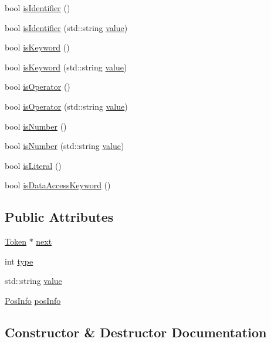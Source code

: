 \begin{DoxyCompactItemize}
bool \hyperlink{classToken_ab4d90d6de9f8682d829c4e2461c6aad0}{is\+Identifier} ()
\item 
bool \hyperlink{classToken_a3763eac81818ee9664a67f2b0e058420}{is\+Identifier} (std\+::string \hyperlink{classToken_a4b7142147b8598f8e24c404928d9263b}{value})
\item 
bool \hyperlink{classToken_a5ce5cda79ee936e3c9ff0fb3969420f8}{is\+Keyword} ()
\item 
bool \hyperlink{classToken_a86d5ce12cf462b6621ccc2a8465b5bc0}{is\+Keyword} (std\+::string \hyperlink{classToken_a4b7142147b8598f8e24c404928d9263b}{value})
\item 
bool \hyperlink{classToken_a5392c44a7daf5fba6caa41ce12385a51}{is\+Operator} ()
\item 
bool \hyperlink{classToken_ad7245e07c9d34fa9e9e5f497b221494f}{is\+Operator} (std\+::string \hyperlink{classToken_a4b7142147b8598f8e24c404928d9263b}{value})
\item 
bool \hyperlink{classToken_a4aabdc4152c3a1b000a83488c420a7d3}{is\+Number} ()
\item 
bool \hyperlink{classToken_a4d5ebcf88c3cbfb292fed830172b6e2e}{is\+Number} (std\+::string \hyperlink{classToken_a4b7142147b8598f8e24c404928d9263b}{value})
\item 
bool \hyperlink{classToken_afd50bb7c9ca079392c1edda106bd6345}{is\+Literal} ()
\item 
bool \hyperlink{classToken_a8740433e25b7cc9298c98ce4bac88c42}{is\+Data\+Access\+Keyword} ()
\end{DoxyCompactItemize}
\subsection*{Public Attributes}
\begin{DoxyCompactItemize}
\item 
\hyperlink{classToken}{Token} $\ast$ \hyperlink{classToken_a32f24a25af788c192e5b387dc8d67914}{next}
\item 
int \hyperlink{classToken_ae46b6b806df89709a13a14dc76c86623}{type}
\item 
std\+::string \hyperlink{classToken_a4b7142147b8598f8e24c404928d9263b}{value}
\item 
\hyperlink{classPosInfo}{Pos\+Info} \hyperlink{classToken_a1eea7460906ca57268f808f011af34e6}{pos\+Info}
\end{DoxyCompactItemize}


\subsection{Constructor \& Destructor Documentation}
\mbox{\label{classToken_afe885acc6bfe5ca1d37e3879764a7e20}} 
